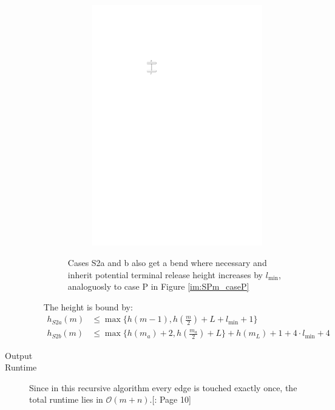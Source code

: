 \begin{description}
\begin{itemize}
\begin{figure}[H]
\begin{subfigure}{0.7\linewidth}
	\includegraphics[width=\textwidth,page=13]{drawings/2-trees.pdf}
	\caption{}
\end{subfigure}
	\caption{Cases S2a and b also get a bend where necessary and inherit potential terminal release height increases by $l_{\min}$, analoguosly to case P in Figure \ref{im:SPm_caseP}}\label{im:SPm_S2ab}
\end{figure}
		The height is bound by:
		\begin{align}
			h_{S2a}(m)&\leq \max\{h(m-1),h\left(\frac{m}{2}\right)+L+l_{\min}+1\}\\
			h_{S2b}(m)&\leq \max\{h(m_a)+2,h\left(\frac{m_a}{2}\right)+L\}+h(m_L)+1 + 4\cdot l_{\min}+4
		\end{align}
	\end{itemize}
	\item[Output] 
	\item[Runtime] Since in this recursive algorithm every edge is touched exactly once, the total runtime lies in $\mathcal{O}(m+n)$.[\cite{DBLP:journals/dcg/Biedl11}: Page 10]
\end{description}
